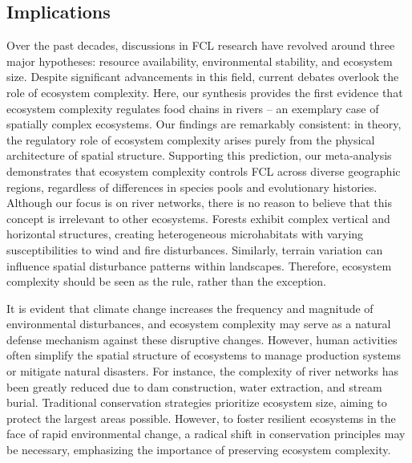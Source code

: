 \documentclass[11pt, class=article, crop=false]{standalone}
\begin{document}
\subsection{Implications}
Over the past decades, discussions in FCL research have revolved around three major hypotheses: resource availability, environmental stability, and ecosystem size.
Despite significant advancements in this field, current debates overlook the role of ecosystem complexity.
Here, our synthesis provides the first evidence that ecosystem complexity regulates food chains in rivers -- an exemplary case of spatially complex ecosystems.
Our findings are remarkably consistent: in theory, the regulatory role of ecosystem complexity arises purely from the physical architecture of spatial structure.
Supporting this prediction, our meta-analysis demonstrates that ecosystem complexity controls FCL across diverse geographic regions, regardless of differences in species pools and evolutionary histories.
Although our focus is on river networks, there is no reason to believe that this concept is irrelevant to other ecosystems.
Forests exhibit complex vertical and horizontal structures, creating heterogeneous microhabitats with varying susceptibilities to wind and fire disturbances.
Similarly, terrain variation can influence spatial disturbance patterns within landscapes. Therefore, ecosystem complexity should be seen as the rule, rather than the exception.

It is evident that climate change increases the frequency and magnitude of environmental disturbances, and ecosystem complexity may serve as a natural defense mechanism against these disruptive changes.
However, human activities often simplify the spatial structure of ecosystems to manage production systems or mitigate natural disasters.
For instance, the complexity of river networks has been greatly reduced due to dam construction, water extraction, and stream burial.
Traditional conservation strategies prioritize ecosystem size, aiming to protect the largest areas possible.
However, to foster resilient ecosystems in the face of rapid environmental change, a radical shift in conservation principles may be necessary, emphasizing the importance of preserving ecosystem complexity.
\end{document}
